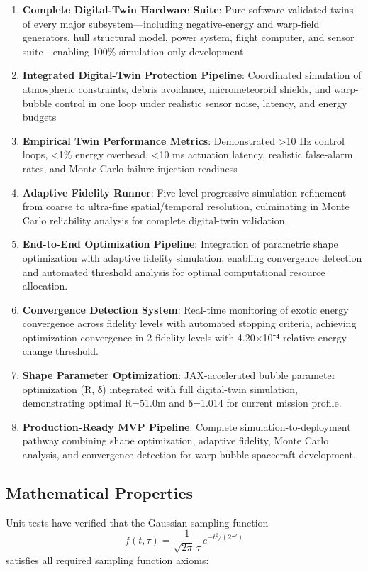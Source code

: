 \documentclass[11pt]{article}
\begin{document}
\begin{enumerate}
\item \textbf{Complete Digital-Twin Hardware Suite}: Pure-software validated twins of every major subsystem—including negative-energy and warp-field generators, hull structural model, power system, flight computer, and sensor suite—enabling 100\% simulation‐only development
\item \textbf{Integrated Digital-Twin Protection Pipeline}: Coordinated simulation of atmospheric constraints, debris avoidance, micrometeoroid shields, and warp-bubble control in one loop under realistic sensor noise, latency, and energy budgets
\item \textbf{Empirical Twin Performance Metrics}: Demonstrated >10 Hz control loops, <1\% energy overhead, <10 ms actuation latency, realistic false-alarm rates, and Monte-Carlo failure-injection readiness
\item \textbf{Adaptive Fidelity Runner}: Five-level progressive simulation refinement from coarse to ultra-fine spatial/temporal resolution, culminating in Monte Carlo reliability analysis for complete digital-twin validation.
\item \textbf{End-to-End Optimization Pipeline}: Integration of parametric shape optimization with adaptive fidelity simulation, enabling convergence detection and automated threshold analysis for optimal computational resource allocation.
\item \textbf{Convergence Detection System}: Real-time monitoring of exotic energy convergence across fidelity levels with automated stopping criteria, achieving optimization convergence in 2 fidelity levels with 4.20×10⁻⁴ relative energy change threshold.
\item \textbf{Shape Parameter Optimization}: JAX-accelerated bubble parameter optimization (R, δ) integrated with full digital-twin simulation, demonstrating optimal R=51.0m and δ=1.014 for current mission profile.
\item \textbf{Production-Ready MVP Pipeline}: Complete simulation-to-deployment pathway combining shape optimization, adaptive fidelity, Monte Carlo analysis, and convergence detection for warp bubble spacecraft development.
\end{enumerate}

\subsection{Mathematical Properties}
Unit tests have verified that the Gaussian sampling function
\begin{equation}
f(t,\tau) = \frac{1}{\sqrt{2\pi}\,\tau}\,e^{-t^2/(2\tau^2)}
\end{equation}
satisfies all required sampling function axioms:
\end{document}
